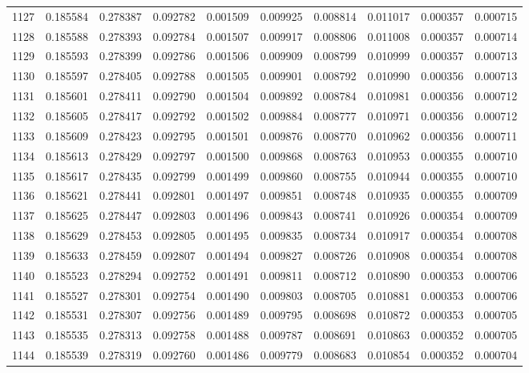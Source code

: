 \begin{tabular}{lrrrrrrrrr}
1127 & 0.185584 & 0.278387 & 0.092782 & 0.001509 & 0.009925 & 0.008814 & 0.011017 & 0.000357 & 0.000715 \\
1128 & 0.185588 & 0.278393 & 0.092784 & 0.001507 & 0.009917 & 0.008806 & 0.011008 & 0.000357 & 0.000714 \\
1129 & 0.185593 & 0.278399 & 0.092786 & 0.001506 & 0.009909 & 0.008799 & 0.010999 & 0.000357 & 0.000713 \\
1130 & 0.185597 & 0.278405 & 0.092788 & 0.001505 & 0.009901 & 0.008792 & 0.010990 & 0.000356 & 0.000713 \\
1131 & 0.185601 & 0.278411 & 0.092790 & 0.001504 & 0.009892 & 0.008784 & 0.010981 & 0.000356 & 0.000712 \\
1132 & 0.185605 & 0.278417 & 0.092792 & 0.001502 & 0.009884 & 0.008777 & 0.010971 & 0.000356 & 0.000712 \\
1133 & 0.185609 & 0.278423 & 0.092795 & 0.001501 & 0.009876 & 0.008770 & 0.010962 & 0.000356 & 0.000711 \\
1134 & 0.185613 & 0.278429 & 0.092797 & 0.001500 & 0.009868 & 0.008763 & 0.010953 & 0.000355 & 0.000710 \\
1135 & 0.185617 & 0.278435 & 0.092799 & 0.001499 & 0.009860 & 0.008755 & 0.010944 & 0.000355 & 0.000710 \\
1136 & 0.185621 & 0.278441 & 0.092801 & 0.001497 & 0.009851 & 0.008748 & 0.010935 & 0.000355 & 0.000709 \\
1137 & 0.185625 & 0.278447 & 0.092803 & 0.001496 & 0.009843 & 0.008741 & 0.010926 & 0.000354 & 0.000709 \\
1138 & 0.185629 & 0.278453 & 0.092805 & 0.001495 & 0.009835 & 0.008734 & 0.010917 & 0.000354 & 0.000708 \\
1139 & 0.185633 & 0.278459 & 0.092807 & 0.001494 & 0.009827 & 0.008726 & 0.010908 & 0.000354 & 0.000708 \\
1140 & 0.185523 & 0.278294 & 0.092752 & 0.001491 & 0.009811 & 0.008712 & 0.010890 & 0.000353 & 0.000706 \\
1141 & 0.185527 & 0.278301 & 0.092754 & 0.001490 & 0.009803 & 0.008705 & 0.010881 & 0.000353 & 0.000706 \\
1142 & 0.185531 & 0.278307 & 0.092756 & 0.001489 & 0.009795 & 0.008698 & 0.010872 & 0.000353 & 0.000705 \\
1143 & 0.185535 & 0.278313 & 0.092758 & 0.001488 & 0.009787 & 0.008691 & 0.010863 & 0.000352 & 0.000705 \\
1144 & 0.185539 & 0.278319 & 0.092760 & 0.001486 & 0.009779 & 0.008683 & 0.010854 & 0.000352 & 0.000704 \\

\end{tabular}
